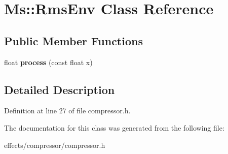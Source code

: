 \hypertarget{class_ms_1_1_rms_env}{}\section{Ms\+:\+:Rms\+Env Class Reference}
\label{class_ms_1_1_rms_env}
\subsection*{Public Member Functions}
\begin{DoxyCompactItemize}
\item 
\mbox{\label{class_ms_1_1_rms_env_a75540710c91cd5626da65682ff4983e8}} 
float {\bfseries process} (const float x)
\end{DoxyCompactItemize}


\subsection{Detailed Description}


Definition at line 27 of file compressor.\+h.



The documentation for this class was generated from the following file\+:\begin{DoxyCompactItemize}
\item 
effects/compressor/compressor.\+h\end{DoxyCompactItemize}
